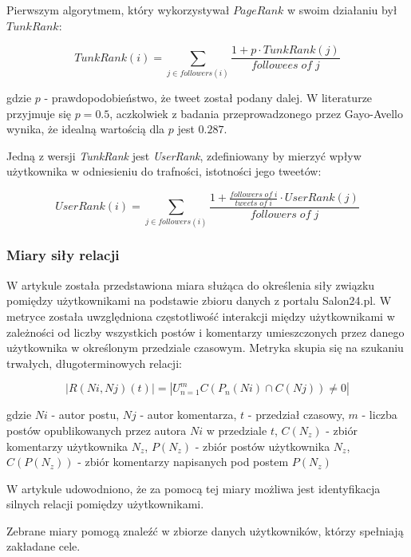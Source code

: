 \documentclass[polish,12pt]{aghthesis}
\begin{document}
Pierwszym algorytmem, który wykorzystywał $PageRank$ w swoim działaniu był $TunkRank$\cite{tunkrank}:

\begin{equation}
    TunkRank(i) = \sum_{j \in followers(i)} \frac{1 + p \cdot TunkRank(j)}{followees\; of\; j} \label{n14}
\end{equation}

gdzie $p$ - prawdopodobieństwo, że tweet został podany dalej. W literaturze przyjmuje się $p = 0.5$, aczkolwiek z badania przeprowadzonego przez Gayo-Avello\cite{tunkrank2} wynika, że idealną wartością dla $p$ jest $0.287$.

Jedną z wersji \textit{TunkRank} jest \textit{UserRank}\cite{userrank}, zdefiniowany by mierzyć wpływ użytkownika w odniesieniu do trafności, istotności jego tweetów:

\begin{equation}
    UserRank(i) =  \sum_{j \in followers(i)} \frac{1 + \frac{followers\; of\; i}{tweets\; of\; i} \cdot UserRank(j)}{followers\; of\; j} \label{n15}
\end{equation}

\subsubsection{Miary siły relacji}
W artykule\cite{relationshipstrength} została przedstawiona miara służąca do określenia siły związku pomiędzy użytkownikami na podstawie zbioru danych z portalu Salon24.pl. W metryce została uwzględniona częstotliwość interakcji między użytkownikami w zależności od liczby wszystkich postów i komentarzy umieszczonych przez danego użytkownika w określonym przedziale czasowym. Metryka skupia się na szukaniu trwałych, długoterminowych relacji:

\begin{equation}
    |R(Ni, Nj)(t)| = |U^m_{n=1}C(P_n(Ni)\cap C(Nj))\neq 0| \label{n16}
\end{equation}

gdzie $Ni$ - autor postu, $Nj$ - autor komentarza, $t$ - przedział czasowy, $m$ - liczba postów opublikowanych przez autora $Ni$ w przedziale $t$, $C(N_z)$ - zbiór komentarzy użytkownika $N_z$, $P(N_z)$ - zbiór postów użytkownika $N_z$, $C(P(N_z))$ - zbiór komentarzy napisanych pod postem $P(N_z)$

W artykule udowodniono, że za pomocą tej miary możliwa jest identyfikacja silnych relacji pomiędzy użytkownikami.


Zebrane miary pomogą znaleźć w zbiorze danych użytkowników, którzy spełniają zakładane cele.
\end{document}
